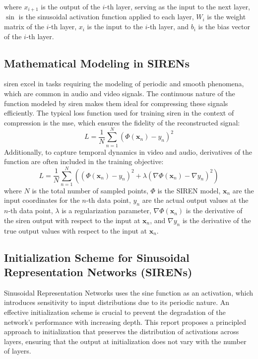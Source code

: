 \documentclass{ioereport}
\begin{document}
    where \( x_{i+1} \) is the output of the \(i\)-th layer, serving as the input to the next layer, \( \sin \) is the sinusoidal activation function applied to each layer, \( W_i \) is the weight matrix of the \(i\)-th layer, \( x_i \) is the input to the \(i\)-th layer, and \( b_i \) is the bias vector of the \(i\)-th layer.

   
    
    \subsection{Mathematical Modeling in SIRENs}
    \gls{siren} excel in tasks requiring the modeling of periodic and smooth phenomena, which are common in audio and video signals. The continuous nature of the function modeled by \gls{siren} makes them ideal for compressing these signals efficiently. The typical loss function used for training \gls{siren} in the context of compression is the \gls{mse}, which ensures the fidelity of the reconstructed signal:
    \begin{equation}
        L = \frac{1}{N} \sum_{n=1}^N (\Phi(\mathbf{x}_n) - y_n)^2 
    \end{equation}
    Additionally, to capture temporal dynamics in video and audio, derivatives of the function are often included in the training objective:
    \begin{equation}
        L = \frac{1}{N} \sum_{n=1}^N \left((\Phi(\mathbf{x}_n) - y_n)^2 + \lambda (\nabla\Phi(\mathbf{x}_n) - \nabla y_n)^2\right) 
    \end{equation}
    where \( N \) is the total number of sampled points, \( \Phi \) is the SIREN model, \( \mathbf{x}_n \) are the input coordinates for the \(n\)-th data point, \( y_n \) are the actual output values at the \(n\)-th data point, \( \lambda \) is a regularization parameter, \( \nabla\Phi(\mathbf{x}_n) \) is the derivative of the \gls{siren} output with respect to the input at \( \mathbf{x}_n \), and \( \nabla y_n \) is the derivative of the true output values with respect to the input at \( \mathbf{x}_n \).


    
    \subsection{Initialization Scheme for Sinusoidal Representation Networks (SIRENs)}
    Sinusoidal Representation Networks uses the sine function as an activation, which introduces sensitivity to input distributions due to its periodic nature. An effective initialization scheme is crucial to prevent the degradation of the network's performance with increasing depth. This report proposes a principled approach to initialization that preserves the distribution of activations across layers, ensuring that the output at initialization does not vary with the number of layers.
\end{document}
